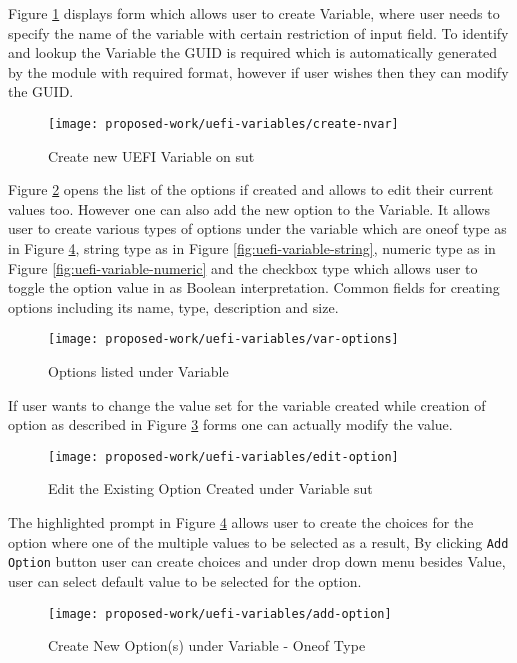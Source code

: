 Figure \ref{fig:uefi-variable-create-nvar} displays form which allows user to create Variable, where user needs to specify the name of the variable with certain restriction of input field. To identify and lookup the Variable the GUID is required which is automatically generated by the module with required format, however if user wishes then they can modify the GUID.
\begin{figure}[!htbp]
	\centering
	\texttt{[image: proposed-work/uefi-variables/create-nvar]}
	\caption{Create new UEFI Variable on \gls{sut}}\label{fig:uefi-variable-create-nvar}
\end{figure}


Figure \ref{fig:uefi-variable-var-options} opens the list of the options if created and allows to edit their current values too. However one can also add the new option to the Variable. It allows user to create various types of options under the variable which are oneof type as in Figure \ref{fig:uefi-variable-add-option}, string type as in Figure \ref{fig:uefi-variable-string}, numeric type as in Figure \ref{fig:uefi-variable-numeric} and the checkbox type which allows user to toggle the option value in as Boolean interpretation. Common fields for creating options including its name, type, description and size.
\begin{figure}[!htbp]
	\centering
	\texttt{[image: proposed-work/uefi-variables/var-options]}
	\caption{Options listed under Variable}\label{fig:uefi-variable-var-options}
\end{figure}

If user wants to change the value set for the variable created while creation of option as described in Figure \ref{fig:uefi-variable-edit-option} forms one can actually modify the value.
\begin{figure}[!htbp]
	\centering
	\texttt{[image: proposed-work/uefi-variables/edit-option]}
	\caption{Edit the Existing Option Created under Variable \gls{sut}}\label{fig:uefi-variable-edit-option}
\end{figure}

The highlighted prompt in Figure \ref{fig:uefi-variable-add-option} allows user to create the choices for the option where one of the multiple values to be selected as a result, By clicking \verb|Add Option| button user can create choices and under drop down menu besides Value, user can select default value to be selected for the option. 
\begin{figure}[!htbp]
	\centering
	\texttt{[image: proposed-work/uefi-variables/add-option]}
	\caption{Create New Option(s) under Variable - Oneof Type}\label{fig:uefi-variable-add-option}
\end{figure}

